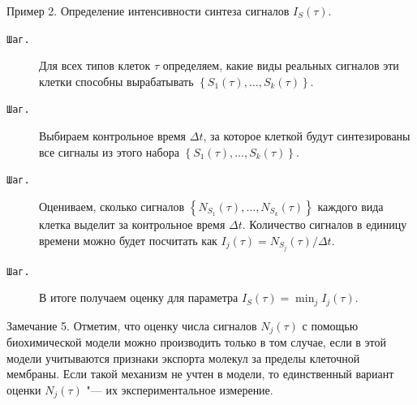 

\hypertarget{naz:ex:2}{} 

 

{\small \sc Пример 2.} Определение интенсивности синтеза сигналов $I_{S}(\tau)$. 



\smallskip



\begin{description}





\item[\tt Шаг.\!\!] Для всех типов клеток $\tau$ определяем, какие виды реальных сигналов эти клетки способны вырабатывать $\left\lbrace  S_{1}(\tau), \dots , S_{k}(\tau) \right\rbrace $.



\item[\tt Шаг.\!\!]\hypertarget{naz:st:2.2}{} Выбираем контрольное время $\Delta t$, за которое клеткой будут синтезированы все сигналы из этого набора $\left\lbrace  S_{1}(\tau), \dots , S_{k}(\tau) \right\rbrace $. 



\item[\tt Шаг.\!\!]\hypertarget{naz:st:2.3}{}  Оцениваем, сколько сигналов $\left\lbrace  N_{S_{1}}(\tau), \dots , N_{S_{k}}(\tau) \right\rbrace $ каждого вида клетка выделит за контрольное время $\Delta t$. Количество сигналов в единицу времени   можно будет посчитать как $I_{j}(\tau) = N_{S_{j}}(\tau)/\Delta t$.



\item[\tt Шаг.\!\!] В итоге получаем оценку для параметра $I_{S}(\tau) = \min _{j}I_{j}(\tau) $.



\end{description}



\smallskip



{\small\sc Замечание 5.} Отметим, что оценку числа сигналов $N_{j}(\tau)$ с помощью биохимической модели можно производить только в том случае, если в этой модели учитываются признаки экспорта молекул за пределы клеточной мембраны. Если такой механизм не учтен в модели, то единственный вариант оценки $N_{j}(\tau)$ "--- их экспериментальное измерение.

 



